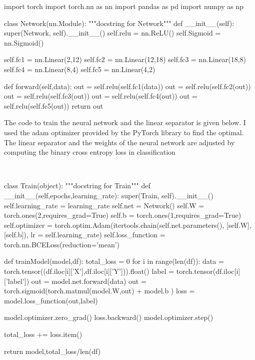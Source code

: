 \documentclass[12pt]{report}
\begin{document}
\begin{python}
	import torch
	import torch.nn as nn
	import pandas as pd
	import numpy as np
	
	class Network(nn.Module):
		"""docstring for Network"""
			def __init__(self):
			super(Network, self).__init__()
			self.relu = nn.ReLU()
			self.Sigmoid = nn.Sigmoid()
			
			self.fc1 = nn.Linear(2,12)
			self.fc2 = nn.Linear(12,18)
			self.fc3 = nn.Linear(18,8)
			self.fc4 = nn.Linear(8,4)
			self.fc5 = nn.Linear(4,2)
		
		def forward(self,data):
			out = self.relu(self.fc1(data))
			out = self.relu(self.fc2(out))
			out = self.relu(self.fc3(out))
			out = self.relu(self.fc4(out))
			out = self.relu(self.fc5(out))
			return out
\end{python}

The code to train the neural network and the linear separator is given below. I used the adam optimizer provided by the PyTorch library to find the optimal. The linear separator and the weights of the neural network are adjusted by computing the binary cross entropy loss in classification

\

\begin{python}
	class Train(object):
		"""docstring for Train"""
		def __init__(self,epochs,learning_rate):
			super(Train, self).__init__()
			self.learning_rate = learning_rate
			self.net = Network()
			self.W = torch.ones(2,requires_grad=True)
			self.b = torch.ones(1,requires_grad=True)
			self.optimizer = torch.optim.Adam(itertools.chain(self.net.parameters(), [self.W], [self.b]), lr = self.learning_rate)
			self.loss_function =  torch.nn.BCELoss(reduction='mean')
			
	def trainModel(model,df):
		total_loss = 0
		for i in range(len(df)):
		data = torch.tensor((df.iloc[i]['X'],df.iloc[i]['Y'])).float()
		label = torch.tensor(df.iloc[i]['label'])
		out = model.net.forward(data)
		out = torch.sigmoid(torch.matmul(model.W,out) + model.b )
		loss = model.loss_function(out,label)
		
		model.optimizer.zero_grad()
		loss.backward()
		model.optimizer.step()
		
		total_loss += loss.item()
		
		return model,total_loss/len(df)
\end{python}
\end{document}
